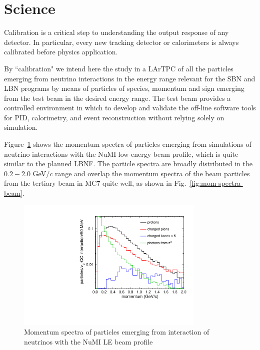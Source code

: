 \documentclass[DIV=calc, paper=a4, fontsize=10pt, twocolumn]{scrartcl}	 %
\begin{document}
{\section{Science}
\label{Science}

Calibration is a critical step to understanding the output response of any detector.  In particular, every new tracking detector or calorimeters is always calibrated before physics application.  

By ``calibration" we intend here the study in a LArTPC of all the particles emerging from neutrino interactions in the energy range relevant for the SBN and LBN programs by means of particles of species, momentum and sign emerging from the test beam in the desired energy range.  The test beam provides a controlled environment in which to develop and validate the off-line software tools for PID, calorimetry, and event reconstruction without relying solely on simulation. 

Figure~\ref{fig:mom-spectra} shows the momentum spectra of particles emerging from simulations  of neutrino interactions with the NuMI low-energy beam profile, which is quite similar to the planned LBNF.  The particle spectra are broadly distributed in the $0.2 - 2.0$ GeV$/c$ range and overlap the momentum spectra of the beam particles from the tertiary beam in MC7 quite well,  as shown in Fig.~\ref{fig:mom-spectra-beam}.
\begin{figure}[!h]
\begin{centering}
\vspace{-0.5cm}
\includegraphics[height=2.5in]{Figures/particle_spectra_logy.pdf}
\vspace{-0.5cm}
\caption{
{\scriptsize \sf Momentum spectra of particles emerging from interaction of neutrinos with the NuMI LE beam profile}
}
\label{fig:mom-spectra}
\end{centering}
\end{figure}

}
\end{document}
